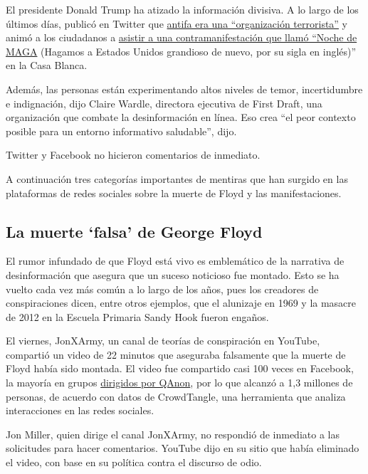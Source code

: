 El presidente Donald Trump ha atizado la información divisiva. A lo
largo de los últimos días, publicó en Twitter que
\href{https://www.nytimes3xbfgragh.onion/reuters/2020/05/31/us/31reuters-minneapolis-police-trump-antifa.html}{antifa
era una ``organización terrorista''} y animó a los ciudadanos a
\href{https://www.nytimes3xbfgragh.onion/2020/05/30/us/politics/trump-threatens-protesters-dogs-weapons.html}{asistir
a una contramanifestación que llamó ``Noche de MAGA} (Hagamos a Estados
Unidos grandioso de nuevo, por su sigla en inglés)'' en la Casa Blanca.

Además, las personas están experimentando altos niveles de temor,
incertidumbre e indignación, dijo Claire Wardle, directora ejecutiva de
First Draft, una organización que combate la desinformación en línea.
Eso crea ``el peor contexto posible para un entorno informativo
saludable'', dijo.

Twitter y Facebook no hicieron comentarios de inmediato.

A continuación tres categorías importantes de mentiras que han surgido
en las plataformas de redes sociales sobre la muerte de Floyd y las
manifestaciones.

\hypertarget{la-muerte-falsa-de-george-floyd}{%
\subsection{La muerte `falsa' de George
Floyd}\label{la-muerte-falsa-de-george-floyd}}

El rumor infundado de que Floyd está vivo es emblemático de la narrativa
de desinformación que asegura que un suceso noticioso fue montado. Esto
se ha vuelto cada vez más común a lo largo de los años, pues los
creadores de conspiraciones dicen, entre otros ejemplos, que el
alunizaje en 1969 y la masacre de 2012 en la Escuela Primaria Sandy Hook
fueron engaños.

El viernes, JonXArmy, un canal de teorías de conspiración en YouTube,
compartió un video de 22 minutos que aseguraba falsamente que la muerte
de Floyd había sido montada. El video fue compartido casi 100 veces en
Facebook, la mayoría en grupos
\href{https://www.nytimes3xbfgragh.onion/2020/02/09/us/politics/qanon-trump-conspiracy-theory.html}{dirigidos
por QAnon}, por lo que alcanzó a 1,3 millones de personas, de acuerdo
con datos de CrowdTangle, una herramienta que analiza interacciones en
las redes sociales.

Jon Miller, quien dirige el canal JonXArmy, no respondió de inmediato a
las solicitudes para hacer comentarios. YouTube dijo en su sitio que
había eliminado el video, con base en su política contra el discurso de
odio.

